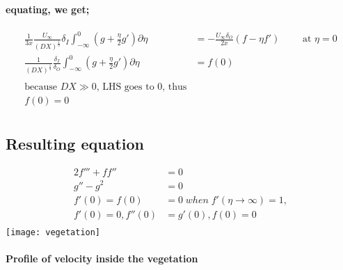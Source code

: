 \documentclass[11pt]{amsart}
\begin{document}
\paragraph{equating, we get;}
\begin{align}
\frac{1}{3x} \frac{U_\infty}{(DX)^\frac{1}{3}} \delta_I \int_{-\infty}^0 (g +\frac{\eta}{2}g') \partial \eta & = - \frac{U_\infty \delta_O}{2x}(f-\eta f') \qquad \text{  at   } \eta=0 \nonumber \\
\frac{1}{(DX)^\frac{1}{3}}\frac{\delta_I}{\delta_O} \int_{-\infty}^0 (g +\frac{\eta}{2}g') \partial \eta & = f(0) \nonumber \\ \nonumber \\
\text{because \(DX \gg 0\), LHS goes to 0, thus} \nonumber \\
f(0) = 0 \nonumber \\ \nonumber
\end{align}
\subsection{Resulting equation} 
\begin{align}
2f''' + ff'' & = 0 \\
g'' - g^2 & = 0 \\
f'(0) = f(0) & = 0 \; when \;  f'(\eta \rightarrow \infty) = 1,  \nonumber \\ \nonumber f'(0) = 0, f''(0) & = g'(0) , f(0) = 0  \\ \nonumber
\end{align}
\texttt{[image: vegetation]}
\paragraph{ Profile of velocity inside the vegetation }
\end{document}
